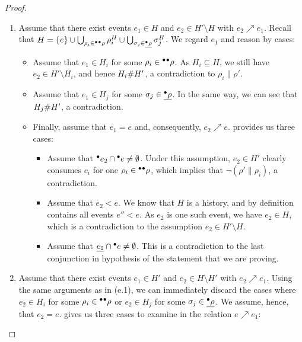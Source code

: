 \begin{proof}
\begin{enumerate}[(a)]
\begin{enumerate}[1.]
\item Assume that there exist events $e_1 \in H$ and $e_2 \in H' \setminus H$
with $e_2 \nearrow e_1$.  Recall that $H = \{e\} \cup \bigcup_{\rho_i \in
{}^\bullet{}^\bullet\rho} \rho^H_i \cup \bigcup_{\sigma_j \in \underline{{}^\bullet\rho}}
\sigma^H_j$.  We regard $e_1$ and reason by cases:

\begin{itemize}
\item Assume that $e_1 \in H_i$ for some $\rho_i \in {}^\bullet{}^\bullet\rho$. As $H_i
\subseteq H$, we still have $e_2 \in H' \setminus H_i$, and hence $H_i \mathord{\#}
H'$, a contradiction to $\rho_i \parallel \rho'$.

\item Assume that $e_1 \in H_j$ for some $\sigma_j \in \underline{{}^\bullet\rho}$.  In
the same way, we can see that $H_j \mathord{\#} H'$, a contradiction.

\item Finally, assume that $e_1 = e$ and, consequently, $e_2 \nearrow e$.
 provides us three cases:

\begin{itemize}
\item Assume that ${}^\bullet e_2 \cap {}^\bullet e \not= \emptyset$.  Under this
assumption, $e_2 \in H'$ clearly consumes $c_i$ for one $\rho_i \in
{}^\bullet{}^\bullet\rho$, which implies that $\lnot (\rho' \parallel \rho_i)$, a
contradiction.

\item Assume that $e_2 < e$.  We know that $H$ is a history, and by definition
contains all events $e'' < e$.  As $e_2$ is one such event, we have $e_2 \in
H$, which is a contradiction to the assumption $e_2 \in H' \setminus H$.

\item Assume that $\underline{e_2} \cap {}^\bullet e \not= \emptyset$.  This is a
contradiction to the last conjunction in hypothesis of the statement that we
are proving.
\end{itemize}
\end{itemize}

\item Assume that there exist events $e_1 \in H'$ and $e_2 \in H \setminus H'$
with $e_2 \nearrow e_1$.  Using the same arguments as in (e.1), we can
immediately discard the cases where $e_2 \in H_i$ for some $\rho_i \in
{}^\bullet{}^\bullet\rho$ or $e_2 \in H_j$ for some $\sigma_j \in \underline{{}^\bullet\rho}$.  We
assume, hence, that $e_2 = e$.   gives us three cases
to examine in the relation $e \nearrow e_1$:


\end{enumerate}
\end{enumerate}
\end{proof}
